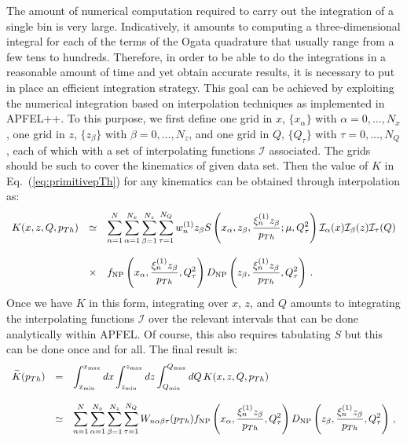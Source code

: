 \documentclass[10pt,a4paper]{article}
\begin{document}
The amount of numerical computation required to carry out the
integration of a single bin is very large. Indicatively, it amounts to
computing a three-dimensional integral for each of the terms of the
Ogata quadrature that usually range from a few tens to
hundreds. Therefore, in order to be able to do the integrations in a
reasonable amount of time and yet obtain accurate results, it is
necessary to put in place an efficient integration strategy. This goal
can be achieved by exploiting the numerical integration based on
interpolation techniques as implemented in APFEL++. To this purpose,
we first define one grid in $x$, $\{x_\alpha\}$ with
$\alpha=0,\dots,N_x$, one grid in $z$, $\{z_\beta\}$ with
$\beta=0,\dots,N_z$, and one grid in $Q$, $\{Q_\tau\}$ with
$\tau=0,\dots,N_Q$, each of which with a set of interpolating
functions $\mathcal{I}$ associated. The grids should be such to cover
the kinematics of given data set. Then the value of $K$ in
Eq.~(\ref{eq:primitivepTh}) for any kinematics can be obtained through
interpolation as:
\begin{equation}
\begin{array}{rcl}
\displaystyle   K(x,z,Q,p_{Th}) &\simeq& \displaystyle 
  \sum_{n=1}^N 
         \sum_{\alpha=1}^{N_x}\sum_{\beta=1}^{N_z}\sum_{\tau=1}^{N_Q}
                                         w_n^{(1)} z_\beta S\left(x_\alpha,z_\beta,\frac{\xi_n^{(1)}z_\beta}{p_{Th}};\mu,Q_\tau^2\right)
                                         \mathcal{I}_\alpha(x)
                                         \mathcal{I}_\beta(z)
                                         \mathcal{I}_\tau(Q) \\
\\
&\times&\displaystyle f_{\rm NP}\left(x_\alpha, \frac{\xi_n^{(1)}z_\beta}{p_{Th}},Q_\tau^2\right) D_{\rm NP}\left(z_\beta, \frac{\xi_n^{(1)}z_\beta}{p_{Th}},Q_\tau^2\right)\,.
\end{array}
\end{equation}
Once we have $K$ in this form, integrating over $x$, $z$, and $Q$
amounts to integrating the interpolating functions $\mathcal{I}$ over
the relevant intervals that can be done analytically within APFEL. Of
course, this also requires tabulating $S$ but this can be done once
and for all. The final result is:
\begin{equation}\label{eq:numintDIS}
\begin{array}{rcl}
  \displaystyle   \widetilde{K}(p_{Th}) &=&\displaystyle \int_{x_{\rm min}}^{x_{\rm
                                            max}}dx\int_{z_{\rm min}}^{z_{\rm max}}dz\int_{Q_{\rm min}}^{Q_{\rm
                                            max}}dQ\,K(x,z,Q,p_{Th}) \\
  \\
                                        &\simeq& \displaystyle 
                                                 \sum_{n=1}^N 
                                                 \sum_{\alpha=1}^{N_x}\sum_{\beta=1}^{N_z}\sum_{\tau=1}^{N_Q}
                                                 W_{n\alpha\beta\tau}(p_{Th}) f_{\rm NP}\left(x_\alpha, \frac{\xi_n^{(1)}z_\beta}{p_{Th}},Q_\tau^2\right) D_{\rm NP}\left(z_\beta, \frac{\xi_n^{(1)}z_\beta}{p_{Th}},Q_\tau^2\right)\,,
\end{array}
\end{equation}
\end{document}
